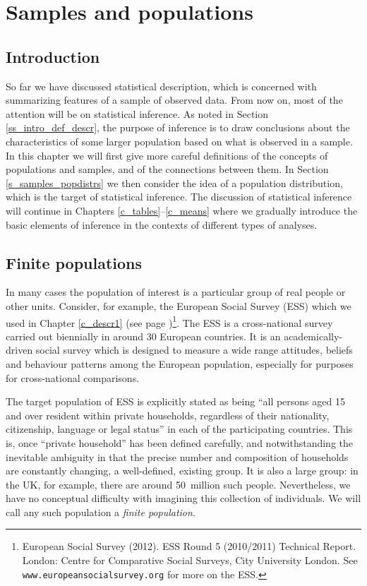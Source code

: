 \chapter{Samples and populations}
\label{c_samples}

\section{Introduction}
\label{s_samples_intro}

So far we have discussed statistical description, which is concerned
with summarizing features of a sample of observed data. From now on,
most of the attention will be on statistical inference. As noted in
Section \ref{ss_intro_def_descr}, the purpose of inference is to draw
conclusions about the characteristics of some larger population based on
what is observed in a sample. In this chapter we will first give more
careful definitions of the concepts of populations and samples, and of
the connections between them. In Section \ref{s_samples_popdistrs} we
then consider the idea of a population distribution, which is the target
of statistical inference. The discussion of statistical inference will
continue in Chapters \ref{c_tables}--\ref{c_means} where we gradually
introduce the basic elements of inference in the contexts of different
types of analyses.

\section{Finite populations}
\label{s_samples_finpops}

In many cases the population of interest is a particular group of real people
or other units. Consider, for example, the European Social Survey (ESS)
which we used in Chapter \ref{c_descr1} (see page
\pageref{p_ess_example})\footnote{ European Social Survey (2012). ESS
Round 5 (2010/2011) Technical Report. London: Centre for Comparative
Social Surveys, City University London. See
\texttt{www.europeansocialsurvey.org} for more on the ESS.}. The ESS is
a cross-national survey carried out biennially in around 30 European
countries. It is an academically-driven social survey which is designed
to measure a wide range attitudes, beliefs and behaviour patterns among
the European population, especially for purposes for cross-national
comparisons.

The target population of ESS is explicitly stated as being ``all persons
aged 15 and over resident within private households, regardless of their
nationality, citizenship, language or legal status'' in each of the
participating countries. This is, once ``private household'' has been
defined carefully, and notwithstanding the inevitable ambiguity in that
the precise number and composition of households are constantly changing,
a well-defined, existing group. It is also a large group: in the
UK, for example, there are around 50~million such people. Nevertheless,
we have no conceptual difficulty with imagining this collection of
individuals. We will call any such population a \emph{finite
population}.

